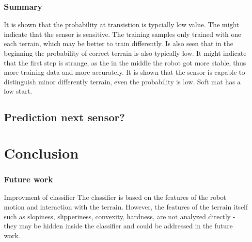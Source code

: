 \documentclass[USenglish]{ifimaster}  %
\begin{document}
\begin{table}[h]
\centering
{}
\caption{MM4 Teppe}
\label{my-label}
\end{table}
\FloatBarrier
\subsection{Summary}
It is shown that the probability at transistion is typcially low value. The might indicate that the sensor is sensitive. The training samples only trained with one each terrain, which may be better to train differently. Is also seen that in the beginning the probability of correct terrain is also typically low. It might indicate that the first step is strange, as the in the middle the robot got more stable, thus more training data and more accurately. It is shown that the sensor is capable to distinguish minor differently terrain, even the probability is low. Soft mat has a low start.

\section{Prediction next sensor?}




\chapter{Conclusion}



\subsection{Future work}
Improvment of classifier
The classifier is based on the features of the robot motion and interaction with the terrain. However, the features of the terrain itself such as slopiness, slipperiness, convexity, hardness, are not analyzed directly - they may be hidden inside the classifier and could be addressed in the future work.
\end{document}
